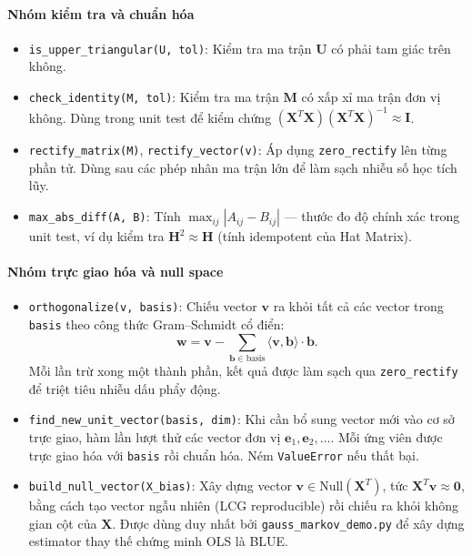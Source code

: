 \paragraph{Nhóm kiểm tra và chuẩn hóa}

\begin{itemize}
    \item \texttt{is\_upper\_triangular(U, tol)}: Kiểm tra ma trận $\mathbf{U}$ có phải tam giác trên không.
    \item \texttt{check\_identity(M, tol)}: Kiểm tra ma trận $\mathbf{M}$ có xấp xỉ ma trận đơn vị không. Dùng trong unit test để kiểm chứng $(\mathbf{X}^T\mathbf{X})(\mathbf{X}^T\mathbf{X})^{-1} \approx \mathbf{I}$.
    \item \texttt{rectify\_matrix(M)}, \texttt{rectify\_vector(v)}: Áp dụng \texttt{zero\_rectify} lên từng phần tử. Dùng sau các phép nhân ma trận lớn để làm sạch nhiễu số học tích lũy.
    \item \texttt{max\_abs\_diff(A, B)}: Tính $\max_{ij}|A_{ij} - B_{ij}|$ --- thước đo độ chính xác trong unit test, ví dụ kiểm tra $\mathbf{H}^2 \approx \mathbf{H}$ (tính idempotent của Hat Matrix).
\end{itemize}

\paragraph{Nhóm trực giao hóa và null space}

\begin{itemize}
    \item \texttt{orthogonalize(v, basis)}: Chiếu vector $\mathbf{v}$ ra khỏi tất cả các vector trong \texttt{basis} theo công thức Gram--Schmidt cổ điển:
    \begin{equation}
        \mathbf{w} = \mathbf{v} - \sum_{\mathbf{b} \in \text{basis}}
        \langle \mathbf{v}, \mathbf{b} \rangle \cdot \mathbf{b}.
    \end{equation}
    Mỗi lần trừ xong một thành phần, kết quả được làm sạch qua \texttt{zero\_rectify} để triệt tiêu nhiễu dấu phẩy động.
    \item \texttt{find\_new\_unit\_vector(basis, dim)}: Khi cần bổ sung vector mới vào cơ sở trực giao, hàm lần lượt thử các vector đơn vị $\mathbf{e}_1, \mathbf{e}_2, \ldots$. Mỗi ứng viên được trực giao hóa với \texttt{basis} rồi chuẩn hóa. Ném \texttt{ValueError} nếu thất bại.
    \item \texttt{build\_null\_vector(X\_bias)}: Xây dựng vector $\mathbf{v} \in \mathrm{Null}(\mathbf{X}^T)$, tức $\mathbf{X}^T\mathbf{v} \approx \mathbf{0}$, bằng cách tạo vector ngẫu nhiên (LCG reproducible) rồi chiếu ra khỏi không gian cột của $\mathbf{X}$. Được dùng duy nhất bởi \texttt{gauss\_markov\_demo.py} để xây dựng estimator thay thế chứng minh OLS là BLUE.
\end{itemize}


